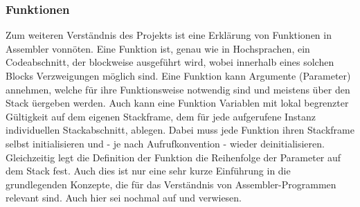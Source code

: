 \documentclass[11pt]{article} %
\begin{document}
\subsubsection{Funktionen}
Zum weiteren Verständnis des Projekts ist eine Erklärung von Funktionen in Assembler vonnöten.
Eine Funktion ist, genau wie in Hochsprachen, ein Codeabschnitt, der blockweise ausgeführt wird,
wobei innerhalb eines solchen Blocks Verzweigungen möglich sind. Eine Funktion kann Argumente
(Parameter) annehmen, welche für ihre Funktionsweise notwendig sind und meistens über den Stack
üergeben werden. Auch kann eine Funktion Variablen mit lokal begrenzter Gültigkeit auf dem eigenen
Stackframe, dem für jede aufgerufene Instanz individuellen Stackabschnitt, ablegen.
Dabei muss jede Funktion ihren Stackframe selbst initialisieren und - je nach Aufrufkonvention -
wieder deinitialisieren. Gleichzeitig legt die Definition der Funktion die Reihenfolge der Parameter
auf dem Stack fest. Auch dies ist nur eine sehr kurze Einführung in die grundlegenden Konzepte, die
für das Verständnis von Assembler-Programmen relevant sind. Auch hier sei nochmal auf
\cite{wikibook1:7} und \cite{wikibook2:8} verwiesen.
\end{document}
